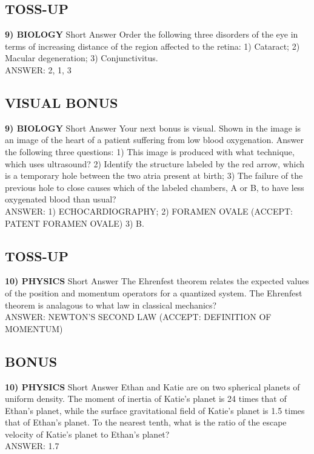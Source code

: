 \documentclass{article}
\begin{document}
\subsection*{TOSS-UP}
\textbf{9) BIOLOGY} Short Answer Order the following three disorders of the eye in terms of increasing distance of the region affected to the retina: 1) Cataract; 2) Macular degeneration; 3) Conjunctivitus.
\\ANSWER: 2, 1, 3

\subsection*{VISUAL BONUS}
\textbf{9) BIOLOGY} Short Answer Your next bonus is visual. Shown in the image is an image of the heart of a patient suffering from low blood oxygenation. Answer the following three questions: 1) This image is produced with what technique, which uses ultrasound? 2) Identify the structure labeled by the red arrow, which is a temporary hole between the two atria present at birth; 3) The failure of the previous hole to close causes which of the labeled chambers, A or B, to have less oxygenated blood than usual?
\\ANSWER: 1) ECHOCARDIOGRAPHY; 2) FORAMEN OVALE (ACCEPT: PATENT FORAMEN OVALE) 3) B.

\subsection*{TOSS-UP}
\textbf{10) PHYSICS} Short Answer The Ehrenfest theorem relates the expected values of the position and momentum operators for a quantized system. The Ehrenfest theorem is analagous to what law in classical mechanics?
\\ANSWER: NEWTON'S SECOND LAW (ACCEPT: DEFINITION OF MOMENTUM)

\subsection*{BONUS}
\textbf{10) PHYSICS} Short Answer Ethan and Katie are on two spherical planets of uniform density. The moment of inertia of Katie's planet is 24 times that of Ethan's planet, while the surface gravitational field of Katie's planet is 1.5 times that of Ethan's planet. To the nearest tenth, what is the ratio of the escape velocity of Katie's planet to Ethan's planet?
\\ANSWER: 1.7
\end{document}
